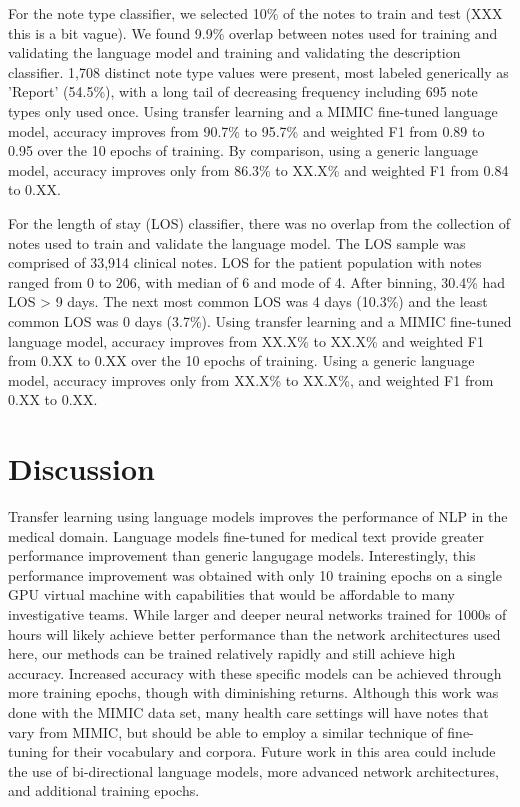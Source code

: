 \documentclass{amia}
\begin{document}
For the note type classifier, we selected 10\% of the notes to train and test (XXX this is a bit vague). We found 9.9\% overlap between notes used for training and validating the language model and training and validating the description classifier. 1,708 distinct note type values were present, most labeled generically as 'Report' (54.5\%), with a long tail of decreasing frequency including 695 note types only used once. Using transfer learning and a MIMIC fine-tuned language model, accuracy improves from 90.7\% to 95.7\% and weighted F1 from 0.89 to 0.95 over the 10 epochs of training. By comparison, using a generic language model, accuracy improves only from 86.3\% to XX.X\% and weighted F1 from 0.84 to 0.XX.

For the length of stay (LOS) classifier, there was no overlap from the collection of notes used to train and validate the language model. The LOS sample was comprised of 33,914 clinical notes. LOS for the patient population with notes ranged from 0 to 206, with median of 6 and mode of 4. After binning, 30.4\% had LOS > 9 days. The next most common LOS was 4 days (10.3\%) and the least common LOS was 0 days (3.7\%). Using transfer learning and a MIMIC fine-tuned language model, accuracy improves from XX.X\% to XX.X\% and weighted F1 from 0.XX to 0.XX over the 10 epochs of training. Using a generic language model, accuracy improves only from XX.X\% to XX.X\%, and weighted F1 from 0.XX to 0.XX. 

\section*{Discussion}

Transfer learning using language models improves the performance of NLP in the medical domain. Language models fine-tuned for medical text provide greater performance improvement than generic langugage models. Interestingly, this performance improvement was obtained with only 10 training epochs on a single GPU virtual machine with capabilities that would be affordable to many investigative teams. While larger and deeper neural networks trained for 1000s of hours will likely achieve better performance than the network architectures used here, our methods can be trained relatively rapidly and still achieve high accuracy. Increased accuracy with these specific models can be achieved through more training epochs, though with diminishing returns. Although this work was done with the MIMIC data set, many health care settings will have notes that vary from MIMIC, but should be able to employ a similar technique of fine-tuning for their vocabulary and corpora. Future work in this area could include the use of bi-directional language models, more advanced network architectures, and additional training epochs.
\end{document}
